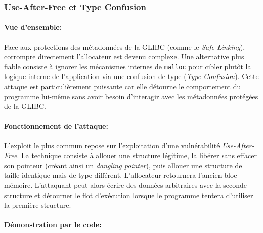 \subsubsection{Use-After-Free et Type Confusion}

\paragraph{Vue d'ensemble:}
Face aux protections des métadonnées de la GLIBC (comme le \textit{Safe Linking}), corrompre directement l'allocateur est devenu complexe. Une alternative plus fiable consiste à ignorer les mécanismes internes de \texttt{malloc} pour cibler plutôt la logique interne de l'application via une confusion de type (\textit{Type Confusion}). Cette attaque est particulièrement puissante car elle détourne le comportement du programme lui-même sans avoir besoin d'interagir avec les métadonnées protégées de la GLIBC.

\paragraph{Fonctionnement de l'attaque:}
L'exploit le plus commun repose sur l'exploitation d'une vulnérabilité \textit{Use-After-Free}. La technique consiste à allouer une structure légitime, la libérer sans effacer son pointeur (créant ainsi un \textit{dangling pointer}), puis allouer une structure de taille identique mais de type différent. L'allocateur retournera l'ancien bloc mémoire. L'attaquant peut alors écrire des données arbitraires avec la seconde structure et détourner le flot d'exécution lorsque le programme tentera d'utiliser la première structure.

\paragraph{Démonstration par le code:}

